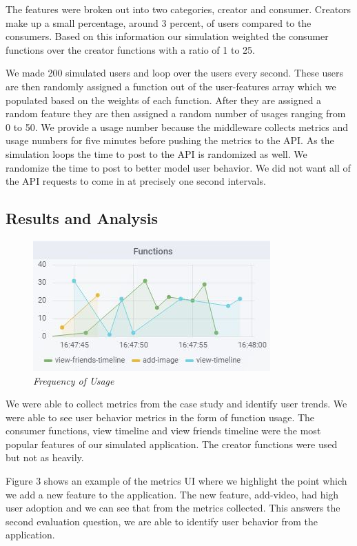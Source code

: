 The features were broken out into two categories, creator and consumer. Creators make up a small percentage, around 3 percent, of users compared to the consumers. Based on this information our simulation weighted the consumer functions over the creator functions with a ratio of 1 to 25.

We made 200 simulated users and loop over the users every second. These users are then randomly assigned a function out of the user-features array which we populated based on the weights of each function. After they are assigned a random feature they are then assigned a random number of usages ranging from 0 to 50. We provide a usage number because the middleware collects metrics and usage numbers for five minutes before pushing the metrics to the API. As the simulation loops the time to post to the API is randomized as well. We randomize the time to post to better model user behavior. We did not want all of the API requests to come in at precisely one second intervals.

\subsection{Results and Analysis}
\begin{figure}  
\begin{center}  
\includegraphics[]{freq.JPG}  
\caption{\small \sl Frequency of Usage\label{fig:freq_example}}  
\end{center}  
\end{figure}  
We were able to collect metrics from the case study and identify user trends. We were able to see user behavior metrics in the form of function usage. The consumer functions, view timeline and view friends timeline were the most popular features of our simulated application. The creator functions were used but not as heavily. 

Figure 3 shows an example of the metrics UI where we highlight the point which we add a new feature to the application. The new feature, add-video, had high user adoption and we can see that from the metrics collected. This answers the second evaluation question, we are able to identify user behavior from the application.

